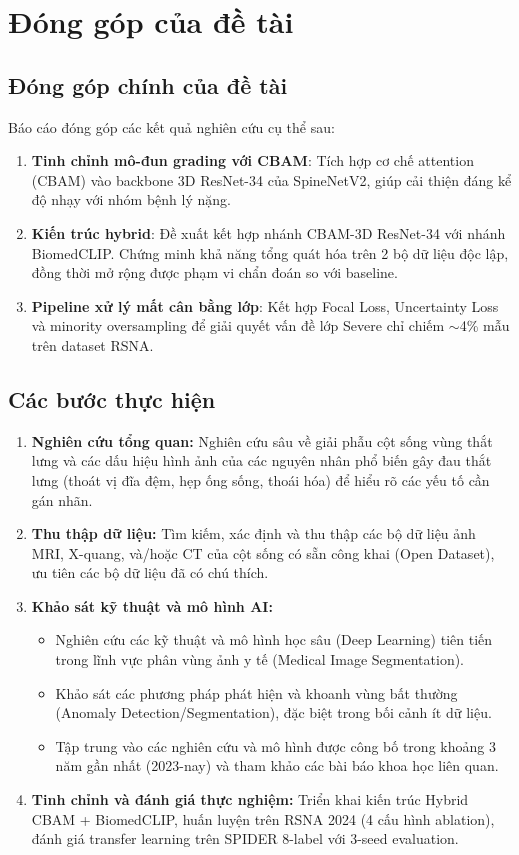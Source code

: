 \section{Đóng góp của đề tài}
\subsection*{Đóng góp chính của đề tài}
Báo cáo đóng góp các kết quả nghiên cứu cụ thể sau:
\begin{enumerate}
    \item \textbf{Tinh chỉnh mô-đun grading với CBAM}: Tích hợp cơ chế attention (CBAM) vào backbone 3D ResNet-34 của SpineNetV2, giúp cải thiện đáng kể độ nhạy với nhóm bệnh lý nặng.
    \item \textbf{Kiến trúc hybrid}: Đề xuất kết hợp nhánh CBAM-3D ResNet-34 với nhánh BiomedCLIP. Chứng minh khả năng tổng quát hóa trên 2 bộ dữ liệu độc lập, đồng thời mở rộng được phạm vi chẩn đoán so với baseline.
    \item \textbf{Pipeline xử lý mất cân bằng lớp}: Kết hợp Focal Loss, Uncertainty Loss và minority oversampling để giải quyết vấn đề lớp Severe chỉ chiếm $\sim$4\% mẫu trên dataset RSNA.
\end{enumerate}

\subsection*{Các bước thực hiện}
\begin{enumerate}
    \item \textbf{Nghiên cứu tổng quan:} Nghiên cứu sâu về giải phẫu cột sống vùng thắt lưng và các dấu hiệu hình ảnh của các nguyên nhân phổ biến gây đau thắt lưng (thoát vị đĩa đệm, hẹp ống sống, thoái hóa) để hiểu rõ các yếu tố cần gán nhãn.
    \item \textbf{Thu thập dữ liệu:} Tìm kiếm, xác định và thu thập các bộ dữ liệu ảnh MRI, X-quang, và/hoặc CT của cột sống có sẵn công khai (Open Dataset), ưu tiên các bộ dữ liệu đã có chú thích.
    \item \textbf{Khảo sát kỹ thuật và mô hình AI:}
    \begin{itemize}
        \item Nghiên cứu các kỹ thuật và mô hình học sâu (Deep Learning) tiên tiến trong lĩnh vực phân vùng ảnh y tế (Medical Image Segmentation).
        \item Khảo sát các phương pháp phát hiện và khoanh vùng bất thường (Anomaly Detection/Segmentation), đặc biệt trong bối cảnh ít dữ liệu.
        \item Tập trung vào các nghiên cứu và mô hình được công bố trong khoảng 3 năm gần nhất (2023-nay) và tham khảo các bài báo khoa học liên quan.
    \end{itemize}
    \item \textbf{Tinh chỉnh và đánh giá thực nghiệm:} Triển khai kiến trúc Hybrid CBAM + BiomedCLIP, huấn luyện trên RSNA 2024 (4 cấu hình ablation), đánh giá transfer learning trên SPIDER 8-label với 3-seed evaluation.
\end{enumerate}

